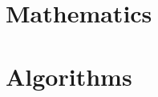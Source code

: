 \documentclass[11pt]{book}
\begin{document}
\dominitoc	%
\tableofcontents




\chapter*{Mathematics}





\chapter*{Algorithms}

\appendix
\end{document}
